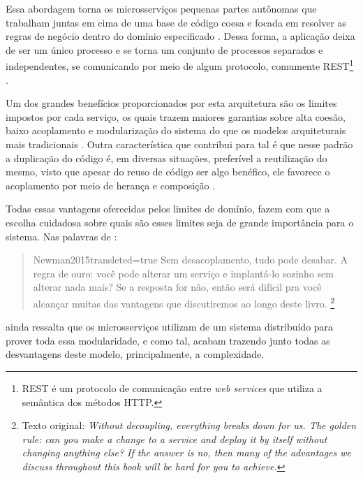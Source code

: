 Essa abordagem torna os microsserviços pequenas partes autônomas que trabalham juntas em cima de uma
base de código coesa e focada em resolver as regras de negócio dentro do domínio especificado
\cite{Newman2015}. Dessa forma, a aplicação deixa de ser um único processo e se torna um conjunto
de processos separados e independentes, se comunicando por meio de algum protocolo, comumente
\gls{REST}\footnote{\gls{REST} é um protocolo de comunicação entre \textit{web services} que utiliza
a semântica dos métodos HTTP.} \cite{MartinFowler:Microservices}.

Um dos grandes benefícios proporcionados por esta arquitetura são os limites impostos por cada
serviço, os quais trazem maiores garantias sobre alta coesão, baixo acoplamento e modularização do
sistema do que os modelos arquiteturais mais tradicionais \cite{MartinFowler:MicroserviceTradeOffs}.
Outra característica que contribui para tal é que nesse padrão a duplicação do código é, em diversas
situações, preferível a reutilização do mesmo, visto que apesar do reuso de código ser algo
benéfico, ele favorece o acoplamento por meio de herança e composição
\cite{Richards2020:FundamentalsOfSoftwareArchitecture}.

Todas essas vantagens oferecidas pelos limites de domínio, fazem com que a
escolha cuidadosa sobre quais são esses limites seja de grande importância para o sistema. Nas
palavras de :

\begin{quotation}{Newman2015}{transleted=true}
    Sem desacoplamento, tudo pode desabar. A regra de ouro: você pode alterar um serviço e
    implantá-lo sozinho sem alterar nada mais? Se a resposta for não, então será difícil pra você
    alcançar muitas das vantagens que discutiremos ao longo deste livro.  \footnote{Texto original:
    \textit{Without decoupling, everything breaks down for us. The golden
    rule: can you make a change to a service and deploy it by itself without changing anything else?
    If the answer is no, then many of the advantages we discuss throughout this book will be hard for
    you to achieve. }}
\end{quotation}

 ainda ressalta que os microsserviços utilizam de um sistema
distribuído para prover toda essa modularidade, e como tal, acabam trazendo junto todas as
desvantagens deste modelo, principalmente, a complexidade.


